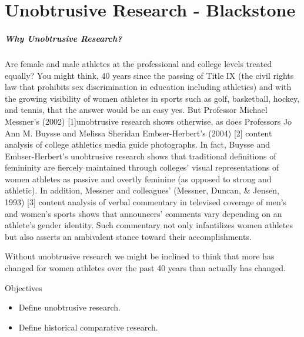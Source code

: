 \chapter{Unobtrusive Research - Blackstone}\label{ch14:unobtrusive_research}

\paragraph{Why Unobtrusive Research?}

Are female and male athletes at the professional and college levels treated equally? You might think, 40 years since the passing of Title IX (the civil rights law that prohibits sex discrimination in education including athletics) and with the growing visibility of women athletes in sports such as golf, basketball, hockey, and tennis, that the answer would be an easy yes. But Professor Michael Messner’s (2002) [1]unobtrusive research shows otherwise, as does Professors Jo Ann M. Buysse and Melissa Sheridan Embser-Herbert’s (2004) [2] content analysis of college athletics media guide photographs. In fact, Buysse and Embser-Herbert’s unobtrusive research shows that traditional definitions of femininity are fiercely maintained through colleges’ visual representations of women athletes as passive and overtly feminine (as opposed to strong and athletic). In addition, Messner and colleagues’ (Messner, Duncan, \& Jensen, 1993) [3] content analysis of verbal commentary in televised coverage of men’s and women’s sports shows that announcers’ comments vary depending on an athlete’s gender identity. Such commentary not only infantilizes women athletes but also asserts an ambivalent stance toward their accomplishments.

Without unobtrusive research we might be inclined to think that more has changed for women athletes over the past 40 years than actually has changed.

\begin{center}
	\begin{objbox}{Objectives}
		\begin{itemize}
			\setlength{\itemsep}{0pt}
			\setlength{\parskip}{0pt}
			\setlength{\parsep}{0pt}
			
			\item Define unobtrusive research.
			\item Define historical comparative research.
			
		\end{itemize}
	\end{objbox}
\end{center}

